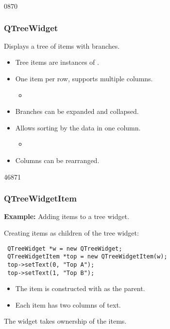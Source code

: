 \begin{slide}{0870}\frametitle{QTreeWidget}

Displays a tree of items with branches.

\begin{itemize}
\item Tree items are instances of .
\item One item per row, supports multiple columns.
\begin{itemize}
\item {}
\end{itemize}
\item Branches can be expanded and collapsed.
\item Allows sorting by the data in one column.
\begin{itemize}
\item {}
\end{itemize}
\item Columns can be rearranged.
\end{itemize}

\vspace*{0.5em}

\end{slide}

\begin{slide}[fragile]{46871}\frametitle{QTreeWidgetItem}

\textbf{Example:} Adding items to a tree widget.

\vspace*{0.5em}
Creating items as children of the tree widget:

\vspace*{0.5em}
\begin{lstlisting}
 QTreeWidget *w = new QTreeWidget;
 QTreeWidgetItem *top = new QTreeWidgetItem(w);
 top->setText(0, "Top A");
 top->setText(1, "Top B");
\end{lstlisting}

\begin{itemize}
\item The item is constructed with  as the parent.
\item Each item has two columns of text.
\end{itemize}

\vspace*{0.5em}
The widget takes ownership of the items.
\vfill
{}
\end{slide}

